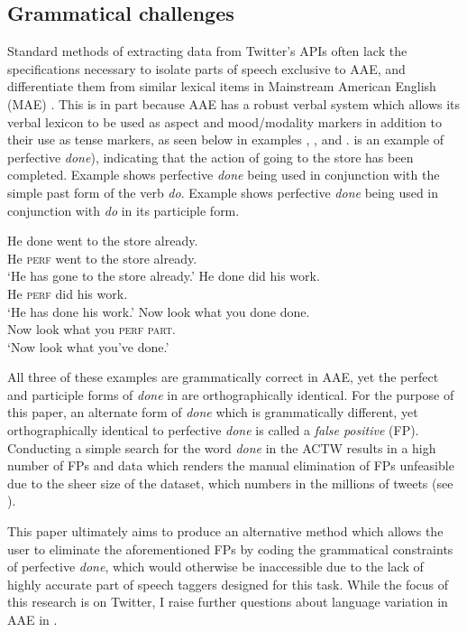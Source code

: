 \documentclass[output=paper,draftmode,colorlinks,citecolor=brown]{langscibook}
\begin{document}
\subsection{Grammatical challenges}
\label{sec:baxter:2.1}
Standard methods of extracting data from Twitter’s APIs often lack the specifications necessary to isolate parts of speech exclusive to AAE, and differentiate them from similar lexical items in Mainstream American English (MAE) \citep{JørgensenHovySøgaard2015}. This is in part because AAE has a robust verbal system which allows its verbal lexicon to be used as aspect and mood/modality markers in addition to their use as tense markers, as seen below in examples , , and .  is an example of perfective \textit{done}), indicating that the action of going to the store has been completed. Example  shows perfective \textit{done} being used in conjunction with the simple past form of the verb \textit{do}. Example  shows perfective \textit{done} being used in conjunction with \textit{do} in its participle form.

\ea \label{ex:baxter:4}
He done   went   to the store already. \\
He \textsc{perf}   went   to the store already. \\
\glt ‘He has gone to the store already.’
\ex \label{ex:baxter:5}
He done   did     his work. \\
He \textsc{perf}   did   his work.\\
\glt ‘He has done his work.’
\ex \label{ex:baxter:6}
Now look what you done done. \\
Now look what you \textsc{perf} \textsc{part}. \\
\glt ‘Now look what you’ve done.’
\z

All three of these examples are grammatically correct in AAE, yet the perfect and participle forms of \textit{done} in  are orthographically identical. For the purpose of this paper, an alternate form of \textit{done} which is grammatically different, yet orthographically identical to perfective \textit{done} is called a \textit{false positive} (FP). Conducting a simple search for the word \textit{done} in the ACTW results in a high number of FPs and data which renders the manual elimination of FPs unfeasible due to the sheer size of the dataset, which numbers in the millions of tweets (see ).

This paper ultimately aims to produce an alternative method which allows the user to eliminate the aforementioned FPs by coding the grammatical constraints of perfective \textit{done}, which would otherwise be inaccessible due to the lack of highly accurate part of speech taggers designed for this task. While the focus of this research is on Twitter, I raise further questions about language variation in AAE in .
\end{document}
